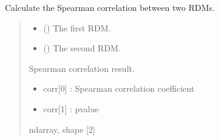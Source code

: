 \documentclass[letterpaper,10pt,english]{sphinxhowto}
\begin{document}
\begin{fulllineitems}
\label{\detokenize{rdm_corr:neurora.rdm_corr.rdm_correlation_spearman}}
\pysigstartsignatures
{}
\pysigstopsignatures
\sphinxAtStartPar
Calculate the Spearman correlation between two RDMs.
\begin{quote}\begin{description}
\begin{itemize}
\item {} 
\sphinxAtStartPar
{} (\sphinxstyleliteralemphasis{\sphinxupquote{, }}\sphinxstyleliteralemphasis{\sphinxupquote{ {[}}}\sphinxstyleliteralemphasis{\sphinxupquote{, }}\sphinxstyleliteralemphasis{\sphinxupquote{{]}}}) \textendash{} The first RDM.

\item {} 
\sphinxAtStartPar
{} (\sphinxstyleliteralemphasis{\sphinxupquote{, }}\sphinxstyleliteralemphasis{\sphinxupquote{ {[}}}\sphinxstyleliteralemphasis{\sphinxupquote{, }}\sphinxstyleliteralemphasis{\sphinxupquote{{]}}}) \textendash{} The second RDM.

\end{itemize}

\sphinxAtStartPar

\sphinxAtStartPar
{} \textendash{} Spearman correlation result.
\begin{itemize}
\item {} 
\sphinxAtStartPar
corr{[}0{]} : Spearman correlation coefficient

\item {} 
\sphinxAtStartPar
corr{[}1{]} : p\sphinxhyphen{}value

\end{itemize}


\sphinxAtStartPar
ndarray, shape {[}2{]}

\end{description}\end{quote}

\end{fulllineitems}
\end{document}
